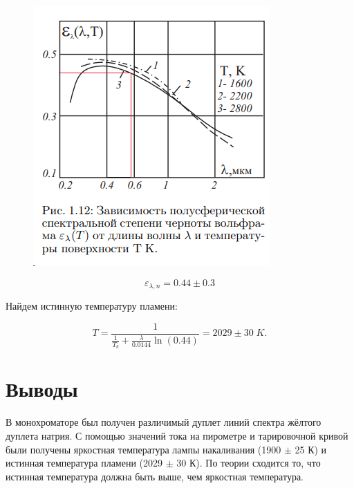 \documentclass[12pt,a4paper]{article}
\begin{document}
	\begin{figure}[H]
		\centering
		\includegraphics[scale=1.2]{8}
		\caption{}
		\label{fig:8}
	\end{figure}

	
	\begin{equation}
		\varepsilon_{\lambda, n} = 0.44 \pm 0.3
	\end{equation}

	Найдем истинную температуру пламени: 

	\begin{equation}
		T = \frac{1}{\frac{1}{T_b} + \frac{\lambda}{0.0144}\ln(0.44)} = 2029 \pm 30 \; K.
	\end{equation}
	
	\section{Выводы}
	
	В монохроматоре был получен различимый дуплет линий спектра жёлтого дуплета натрия. С помощью значений тока на пирометре и тарировочной кривой были получены яркостная температура лампы накаливания (1900 $\pm$ 25 К) и истинная температура пламени (2029 $\pm$ 30 К). По
	теории сходится то, что истинная температура должна быть выше, чем яркостная температура.
	
	
\end{document}
